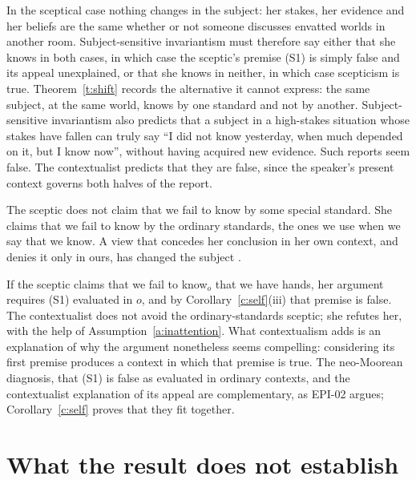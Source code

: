 \documentclass{situationist-preprint}
\begin{document}
\begin{reply}
In the sceptical case nothing changes in the subject: her stakes, her evidence and her beliefs are the same whether or not someone discusses envatted worlds in another room. Subject-sensitive invariantism must therefore say either that she knows in both cases, in which case the sceptic's premise (S1) is simply false and its appeal unexplained, or that she knows in neither, in which case scepticism is true. Theorem~\ref{t:shift} records the alternative it cannot express: the same subject, at the same world, knows by one standard and not by another. Subject-sensitive invariantism also predicts that a subject in a high-stakes situation whose stakes have fallen can truly say \enquote{I did not know yesterday, when much depended on it, but I know now}, without having acquired new evidence. Such reports seem false. The contextualist predicts that they are false, since the speaker's present context governs both halves of the report.
\end{reply}

\begin{objection}
The sceptic does not claim that we fail to know by some special standard. She claims that we fail to know by the ordinary standards, the ones we use when we say that we know. A view that concedes her conclusion in her own context, and denies it only in ours, has changed the subject \citep{Feldman1999,Sosa2000}.
\end{objection}

\begin{reply}
If the sceptic claims that we fail to know$_o$ that we have hands, her argument requires (S1) evaluated in $o$, and by Corollary~\ref{c:self}(iii) that premise is false. The contextualist does not avoid the ordinary-standards sceptic; she refutes her, with the help of Assumption~\ref{a:inattention}. What contextualism adds is an explanation of why the argument nonetheless seems compelling: considering its first premise produces a context in which that premise is true. The neo-Moorean diagnosis, that (S1) is false as evaluated in ordinary contexts, and the contextualist explanation of its appeal are complementary, as EPI-02 argues; Corollary~\ref{c:self} proves that they fit together.
\end{reply}

\section{What the result does not establish}
\end{document}
